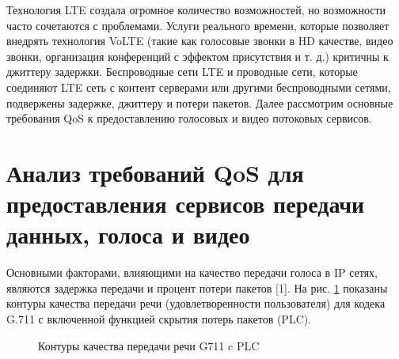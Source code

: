 Технология LTE создала огромное количество возможностей, но возможности часто сочетаются с проблемами. 
Услуги реального времени, которые позволяет внедрять технология VoLTE (такие как голосовые звонки в HD качестве, видео звонки, организация конференций с эффектом присутствия и т. д.) критичны к джиттеру задержки. 
Беспроводные сети LTE и проводные сети, которые соединяют LTE сеть с контент серверами или другими беспроводными сетями, подвержены задержке, джиттеру и потери пакетов. 
Далее рассмотрим основные требования QoS к предоставлению голосовых и видео потоковых сервисов.
\section{Анализ требований QoS для предоставления сервисов передачи данных, голоса и видео } \label{sect_qos}

Основными факторами,  влияющими на качество передачи голоса в IP  сетях,  являются задержка передачи и процент потери пакетов [1].
На рис. \ref{img1:qos_dd} показаны контуры качества передачи речи (удовлетворенности пользователя) для кодека G.711 с включенной функцией скрытия потерь пакетов (PLC).

\pgfplotsset{width=15cm, height=10cm, compat=1.3}
\begin{figure} [h]
  \center
{}
\caption{Контуры качества передачи речи G711 c PLC}
  \label{img1:qos_dd}
\end{figure}



